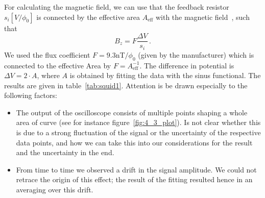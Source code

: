 For calculating the magnetic field, we can use that
the feedback resistor $s_i [V/\phi_0]$ is connected by the effective area $A_{\mathrm{eff}}$
with the magnetic field~\cite{ver}, such that
\begin{equation}
B_z = F \frac{\Delta V}{s_i} \, .
\end{equation}
We used the flux coefficient $F = 9.3$nT$/\phi_0$ (given by the manufacturer) 
which is connected to the effective Area by $F = A_{\mathrm{eff}}^{-1}$. 
The difference in potential is $\Delta V = 2 \cdot A$, 
where $A$ is obtained by fitting the data with the sinus functional. 
The results are given in table~\ref{tab:squid1}.
Attention is be drawn especially to the following factors:
\begin{itemize}
    \item The output of the oscilloscope consists of multiple points shaping a
        whole area of curve (see for instance figure~\ref{fig:4_3_plot}). Is not clear
        whether this is due to a strong fluctuation of the signal or the uncertainty of the
        respective data points, and how we can take this into our considerations 
        for the result and the uncertainty in the end.
    \item From time to time we observed a drift in the signal amplitude. We
        could not retrace the origin of this effect; the result of the fitting 
        resulted hence in an averaging over this drift.
\end{itemize}

